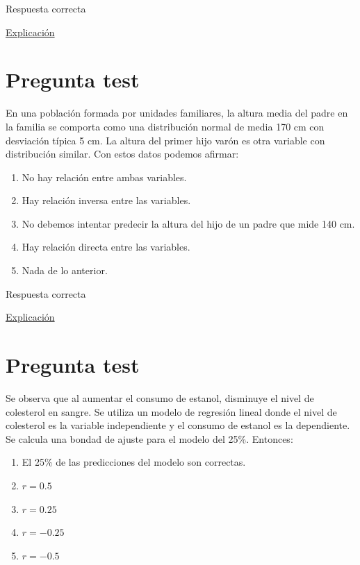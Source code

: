 \documentclass[
]{book}
\providecommand{\tightlist}{%
  \setlength{\itemsep}{0pt}\setlength{\parskip}{0pt}}
\begin{document}
Respuesta correcta

\href{https://www.cdc.gov/healthyweight/spanish/assessing/bmi/adult_bmi/index.html}{Explicación}

\hypertarget{pregunta-test-128}{%
\section{Pregunta test}\label{pregunta-test-128}}

En una población formada por unidades familiares, la altura media del padre en la familia se comporta como una distribución normal de media 170 cm con desviación típica 5 cm. La altura del primer hijo varón es otra variable con distribución similar. Con estos datos podemos afirmar:

\begin{enumerate}
\def\labelenumi{\alph{enumi})}
\tightlist
\item
  No hay relación entre ambas variables.
\item
  Hay relación inversa entre las variables.
\item
  No debemos intentar predecir la altura del hijo de un padre que mide 140 cm.
\item
  Hay relación directa entre las variables.
\item
  Nada de lo anterior.
\end{enumerate}

Respuesta correcta

\href{https://www.feedingthemachine.ai/regresion-lineal-y-los-outliers/}{Explicación}

\hypertarget{pregunta-test-129}{%
\section{Pregunta test}\label{pregunta-test-129}}

Se observa que al aumentar el consumo de estanol, disminuye el nivel de colesterol en sangre. Se utiliza un modelo de regresión lineal donde el nivel de colesterol es la variable independiente y el consumo de estanol es la dependiente. Se calcula una bondad de ajuste para el modelo del 25\%. Entonces:

\begin{enumerate}
\def\labelenumi{\alph{enumi})}
\tightlist
\item
  El 25\% de las predicciones del modelo son correctas.
\item
  \(r= 0.5\)
\item
  \(r= 0.25\)
\item
  \(r= -0.25\)
\item
  \(r= -0.5\)
\end{enumerate}
\end{document}
